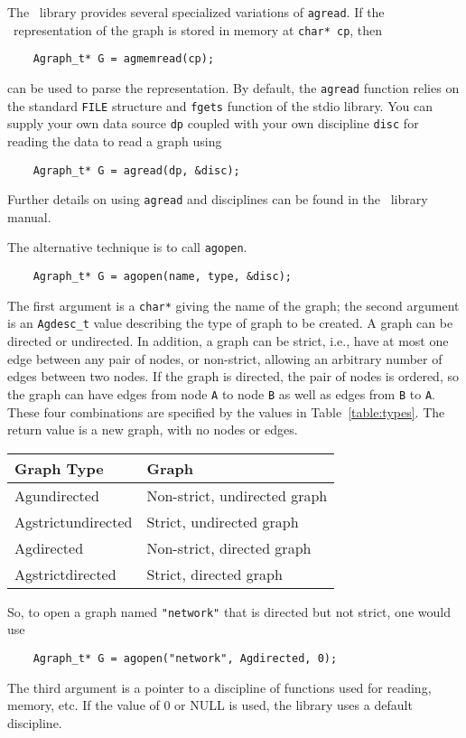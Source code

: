 The \gviz\ library provides several specialized variations of {\tt agread}. If
the \DOT\ representation of the graph is stored in memory at {\tt char* cp}, then
\begin{verbatim}
    Agraph_t* G = agmemread(cp);
\end{verbatim}
can be used to parse the representation. By default, the {\tt agread} function relies on the
standard {\tt FILE} structure and {\tt fgets} function of the stdio library. You
can supply your own data source {\tt dp} coupled with your own discipline {\tt disc} 
for reading the data to read a graph using
\begin{verbatim}
    Agraph_t* G = agread(dp, &disc);
\end{verbatim}
Further details on using {\tt agread} and disciplines can be found in the \graph\ library manual.

The alternative technique is to call {\tt agopen}. 
\begin{verbatim}
    Agraph_t* G = agopen(name, type, &disc);
\end{verbatim}
The first argument is a {\tt char*} giving the name of the graph; 
the second argument is an {\tt Agdesc\_t} value describing the type of graph
to be created. A graph can be directed or undirected. In
addition, a graph can be strict, i.e., have at most one edge between
any pair of nodes, or non-strict, allowing an arbitrary number of edges
between two nodes. If the graph is directed, the pair of nodes is ordered,
so the graph can have edges from node {\tt A} to node {\tt B} as well
as edges from {\tt B} to {\tt A}. These four combinations are specified
by the values in Table~\ref{table:types}.
The return value is a new graph, with no nodes or edges.
\begin{table*}[h]
\centering
\begin{tabular}{|l|l|} \hline
Graph Type & Graph \\ \hline
Agundirected & Non-strict, undirected graph \\
Agstrictundirected & Strict, undirected graph \\
Agdirected & Non-strict, directed graph \\
Agstrictdirected & Strict, directed graph \\ \hline
\end{tabular}
\caption{Graph types}
\label{table:types}
\end{table*}
So, to open a graph named {\tt "network"} that is directed but not strict, one would use
\begin{verbatim}
    Agraph_t* G = agopen("network", Agdirected, 0);
\end{verbatim}
The third argument is a pointer to a discipline of functions used for reading, memory, etc.
If the value of 0 or NULL is used, the library uses a default discipline.

